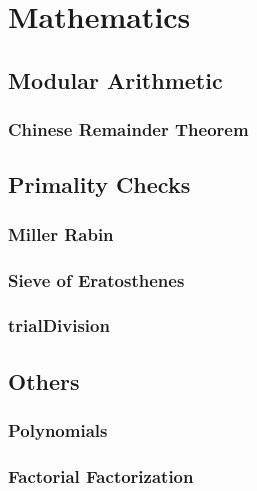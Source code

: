 \documentclass[../Notes/main.tex]{subfiles}
\begin{document}
\section{Mathematics}
\subsection{Modular Arithmetic}

\subsubsection{Chinese Remainder Theorem}


\subsection{Primality Checks}
\subsubsection{Miller Rabin}



\subsubsection{Sieve of Eratosthenes}


\subsubsection{trialDivision}


\subsection{Others}
\subsubsection{Polynomials}


\subsubsection{Factorial Factorization}

\end{document}
